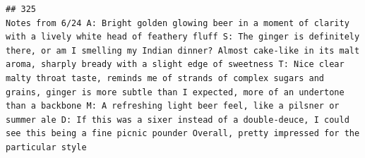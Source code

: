 \documentclass[
  a4paper,
]{article}
\begin{document}
\begin{verbatim}
## 325                                                                                                                                                                                                                                                                                                                                                                                                                                                                                                                                                                                                                                                                                                                                                                                                                                                                                                                                                                                                                                                                                                                                                                                                                                                                                                                                                                                                                                                                                            Notes from 6/24 A: Bright golden glowing beer in a moment of clarity with a lively white head of feathery fluff S: The ginger is definitely there, or am I smelling my Indian dinner? Almost cake-like in its malt aroma, sharply bready with a slight edge of sweetness T: Nice clear malty throat taste, reminds me of strands of complex sugars and grains, ginger is more subtle than I expected, more of an undertone than a backbone M: A refreshing light beer feel, like a pilsner or summer ale D: If this was a sixer instead of a double-deuce, I could see this being a fine picnic pounder Overall, pretty impressed for the particular style

\end{verbatim}
\end{document}

